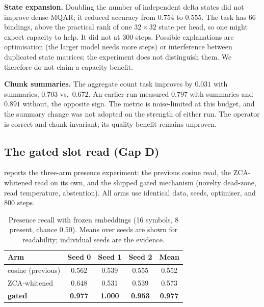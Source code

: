 \textbf{State expansion.} Doubling the number of independent delta states did not improve
dense MQAR; it reduced accuracy from $0.754$ to $0.555$. The task has 66 bindings, above the
practical rank of one $32\times32$ state per head, so one might expect capacity to help. It
did not at 300 steps. Possible explanations are optimisation (the larger model needs more
steps) or interference between duplicated state matrices; the experiment does not distinguish
them. We therefore do not claim a capacity benefit.

\textbf{Chunk summaries.} The aggregate count task improves by $0.031$ with summaries,
$0.703$ vs.\ $0.672$. An earlier run measured $0.797$ with summaries and $0.891$ without,
\ie the opposite sign. The metric is noise-limited at this budget, and the summary change was
not adopted on the strength of either run. The operator is correct and chunk-invariant; its
quality benefit remains unproven.

\subsection{The gated slot read (Gap D)}
\label{sec:results-gap-d}

 reports the three-arm presence experiment: the previous cosine read, the
ZCA-whitened read on its own, and the shipped gated mechanism (novelty dead-zone, read
temperature, abstention). All arms use identical data, seeds, optimiser, and 800 steps.

\begin{table}[t]
\centering
\caption{Presence recall with frozen embeddings (16 symbols, 8 present, chance $0.50$).
Means over seeds are shown for readability; individual seeds are the evidence.}
\label{tab:presence}
\small
\begin{tabularx}{\columnwidth}{@{}l c c c c@{}}
\toprule
Arm & Seed 0 & Seed 1 & Seed 2 & Mean \\
\midrule
cosine (previous) & 0.562 & 0.539 & 0.555 & 0.552 \\
ZCA-whitened & 0.648 & 0.531 & 0.539 & 0.573 \\
\textbf{gated} & \textbf{0.977} & \textbf{1.000} & \textbf{0.953} & \textbf{0.977} \\
\bottomrule
\end{tabularx}
\end{table}

